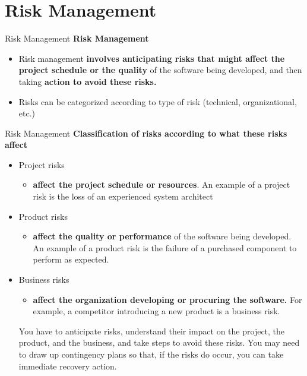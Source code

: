 \documentclass{beamer}
\begin{document}
\section{Risk Management}
\begin{frame}{Risk Management}
	\textbf{Risk Management}
	\begin{itemize}
		\item Risk management \textbf{involves anticipating risks that might affect the project schedule or the quality} of the software being developed, and then taking \textbf{action to avoid these risks.}
		\item Risks can be categorized according to type of risk (technical, 
		organizational, etc.)
	\end{itemize}
\end{frame}
\begin{frame}{Risk Management}
	\textbf{Classification of risks according to what these risks affect}
	\begin{itemize}
		\item Project risks
		\begin{itemize}
			\item \textbf{affect the project schedule or resources}. An example of a 
			project risk is the loss of an experienced system architect
		\end{itemize}
	\item Product risks
	\begin{itemize}
		\item \textbf{affect the quality or performance }of the software being 
		developed. An example of a product risk is the failure of a purchased 
		component to perform as expected.
	\end{itemize}
\item Business risks
\begin{itemize}
	\item \textbf{affect the organization developing or procuring the 
		software. }For example, a competitor introducing a new product is a 
	business risk.
\end{itemize}
You have to anticipate risks, understand their impact on the project, the product, and the business, and 
take steps to avoid these risks. You may need to draw up contingency plans so that, if the risks do 
occur, you can take immediate recovery action.
	\end{itemize}
\end{frame}
\end{document}
